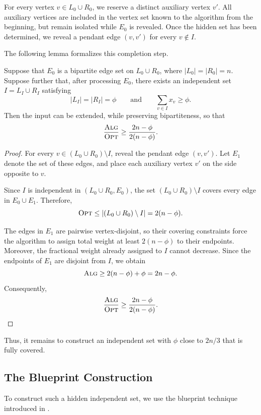 For every vertex $v\in L_0\cup R_0$, we reserve a distinct auxiliary vertex $v'$. All auxiliary vertices are included in the vertex set known to the algorithm from the beginning, but remain isolated while $E_0$ is revealed. Once the hidden set has been determined, we reveal a pendant edge $(v,v')$ for every $v\notin I$.

The following lemma formalizes this completion step.

\begin{lemma}
\label{lem:completion}
Suppose that $E_0$ is a bipartite edge set on $L_0\cup R_0$, where $|L_0|=|R_0|=n$. Suppose further that, after processing $E_0$, there exists an independent set $I=L_I\cup R_I$ satisfying
$$
|L_I|=|R_I|=\phi
\qquad\text{and}\qquad
\sum_{v\in I}x_v\geq \phi.
$$
Then the input can be extended, while preserving bipartiteness, so that
$$
\frac{\textsc{Alg}}{\textsc{Opt}}
\geq
\frac{2n-\phi}{2(n-\phi)}.
$$
\end{lemma}

\begin{proof}
For every $v\in(L_0\cup R_0)\setminus I$, reveal the pendant edge $(v,v')$. Let $E_1$ denote the set of these edges, and place each auxiliary vertex $v'$ on the side opposite to $v$.

Since $I$ is independent in $(L_0\cup R_0,E_0)$, the set $(L_0\cup R_0)\setminus I$ covers every edge in $E_0\cup E_1$. Therefore,
$$
\textsc{Opt}
\leq
|(L_0\cup R_0)\setminus I|
=
2(n-\phi).
$$

The edges in $E_1$ are pairwise vertex-disjoint, so their covering constraints force the algorithm to assign total weight at least $2(n-\phi)$ to their endpoints. Moreover, the fractional weight already assigned to $I$ cannot decrease. Since the endpoints of $E_1$ are disjoint from $I$, we obtain
$$
\textsc{Alg}
\geq
2(n-\phi)+\phi
=
2n-\phi.
$$
Consequently,
$$
\frac{\textsc{Alg}}{\textsc{Opt}}
\geq
\frac{2n-\phi}{2(n-\phi)}.
$$
\end{proof}

Thus, it remains to construct an independent set with $\phi$ close to $2n/3$ that is fully covered.

\subsection{The Blueprint Construction}

To construct such a hidden independent set, we use the blueprint technique introduced in \cite{AssadiJiangXiang26a}.

